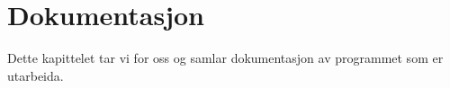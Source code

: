 \chapter{Dokumentasjon}
\thispagestyle{fancy}

Dette kapittelet tar vi for oss og samlar dokumentasjon av programmet som er utarbeida.
